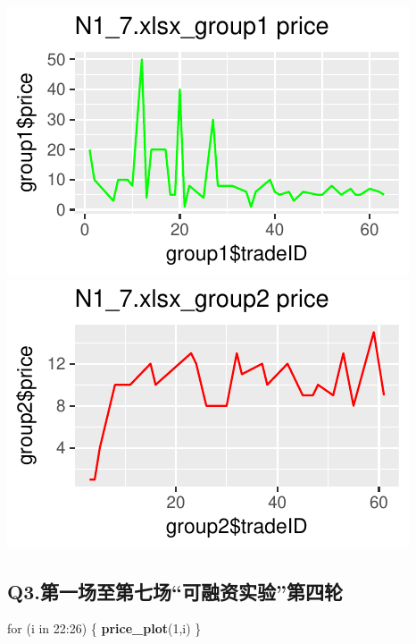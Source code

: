 \documentclass[]{article}
\newenvironment{Shaded}{\begin{snugshade}}{\end{snugshade}}
\newcommand{\KeywordTok}[1]{\textcolor[rgb]{0.13,0.29,0.53}{\textbf{{#1}}}}
\newcommand{\DecValTok}[1]{\textcolor[rgb]{0.00,0.00,0.81}{{#1}}}
\newcommand{\NormalTok}[1]{{#1}}
\begin{document}
\includegraphics{finance_homework_files/figure-latex/unnamed-chunk-4-13.pdf}
\includegraphics{finance_homework_files/figure-latex/unnamed-chunk-4-14.pdf}

\newpage

\subsection{\texorpdfstring{Q3.第一场至第七场``可融资实验''第四轮}{Q3.第一场至第七场可融资实验第四轮}}\label{q3.}

\begin{Shaded}
\begin{Highlighting}[]
\NormalTok{for (i in }\DecValTok{22}\NormalTok{:}\DecValTok{26}\NormalTok{) }
\NormalTok{\{}
  \KeywordTok{price_plot}\NormalTok{(}\DecValTok{1}\NormalTok{,i)}
\NormalTok{\}}
\end{Highlighting}
\end{Shaded}
\end{document}
